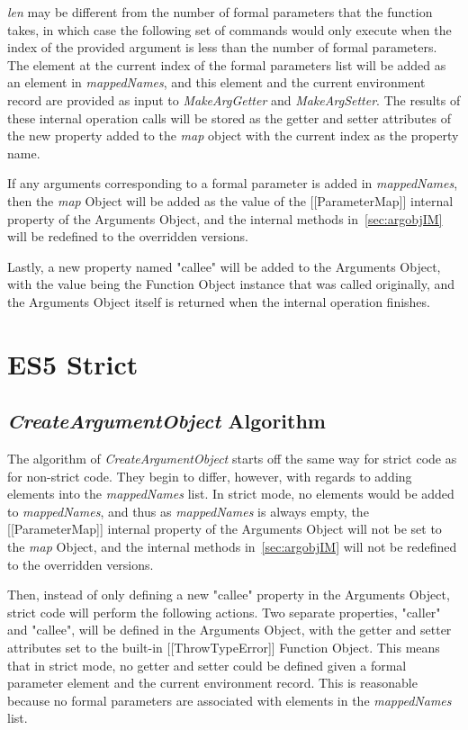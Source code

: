\documentclass[a4paper,11pt,twoside]{report}
\begin{document}
\textit{len} may be different from the number of formal parameters that the function takes, in which case the following set of commands would only execute when the index of the provided argument is less than the number of formal parameters. The element at the current index of the formal parameters list will be added as an element in \textit{mappedNames}, and this element and the current environment record are provided as input to \textit{MakeArgGetter} and \textit{MakeArgSetter}. The results of these internal operation calls will be stored as the getter and setter attributes of the new property added to the \textit{map} object with the current index as the property name.

If any arguments corresponding to a formal parameter is added in \textit{mappedNames}, then the \textit{map} Object will be added as the value of the [[ParameterMap]] internal property of the Arguments Object, and the internal methods in~\ref{sec:argobjIM} will be redefined to the overridden versions.

Lastly, a new property named "callee" will be added to the Arguments Object, with the value being the Function Object instance that was called originally, and the Arguments Object itself is returned when the internal operation finishes.

\section{ES5 Strict}
\subsection{\textit{CreateArgumentObject} Algorithm}
The algorithm of \textit{CreateArgumentObject} starts off the same way for strict code as for non-strict code. They begin to differ, however, with regards to adding elements into the \textit{mappedNames} list. In strict mode, no elements would be added to \textit{mappedNames}, and thus as \textit{mappedNames} is always empty, the [[ParameterMap]] internal property of the Arguments Object will not be set to the \textit{map} Object, and the internal methods in~\ref{sec:argobjIM} will not be redefined to the overridden versions.

Then, instead of only defining a new "callee" property in the Arguments Object, strict code will perform the following actions. Two separate properties, "caller" and "callee", will be defined in the Arguments Object, with the getter and setter attributes set to the built-in [[ThrowTypeError]] Function Object. This means that in strict mode, no getter and setter could be defined given a formal parameter element and the current environment record. This is reasonable because no formal parameters are associated with elements in the \textit{mappedNames} list.
\end{document}
